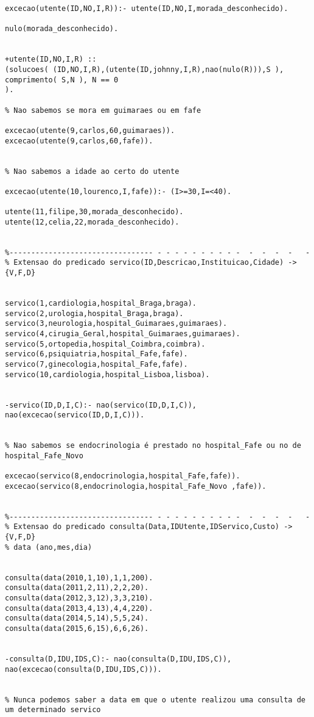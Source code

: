 \documentclass[pdftex,12pt,a4paper]{report}
\begin{document}
\begin{appendices}
\begin{verbatim}
excecao(utente(ID,NO,I,R)):- utente(ID,NO,I,morada_desconhecido).

nulo(morada_desconhecido).


+utente(ID,NO,I,R) :: 
(solucoes( (ID,NO,I,R),(utente(ID,johnny,I,R),nao(nulo(R))),S ),
comprimento( S,N ), N == 0 
).

% Nao sabemos se mora em guimaraes ou em fafe							  

excecao(utente(9,carlos,60,guimaraes)).
excecao(utente(9,carlos,60,fafe)).								  


% Nao sabemos a idade ao certo do utente 

excecao(utente(10,lourenco,I,fafe)):- (I>=30,I=<40).

utente(11,filipe,30,morada_desconhecido).
utente(12,celia,22,morada_desconhecido).									 


%--------------------------------- - - - - - - - - - -  -  -  -  -   -
% Extensao do predicado servico(ID,Descricao,Instituicao,Cidade) ->{V,F,D}


servico(1,cardiologia,hospital_Braga,braga).
servico(2,urologia,hospital_Braga,braga).
servico(3,neurologia,hospital_Guimaraes,guimaraes). 
servico(4,cirugia_Geral,hospital_Guimaraes,guimaraes).
servico(5,ortopedia,hospital_Coimbra,coimbra).
servico(6,psiquiatria,hospital_Fafe,fafe).
servico(7,ginecologia,hospital_Fafe,fafe).
servico(10,cardiologia,hospital_Lisboa,lisboa).


-servico(ID,D,I,C):- nao(servico(ID,D,I,C)),
nao(excecao(servico(ID,D,I,C))).


% Nao sabemos se endocrinologia é prestado no hospital_Fafe ou no de hospital_Fafe_Novo				

excecao(servico(8,endocrinologia,hospital_Fafe,fafe)).
excecao(servico(8,endocrinologia,hospital_Fafe_Novo	,fafe)).


%--------------------------------- - - - - - - - - - -  -  -  -  -   -
% Extensao do predicado consulta(Data,IDUtente,IDServico,Custo) ->{V,F,D}
% data (ano,mes,dia)


consulta(data(2010,1,10),1,1,200).
consulta(data(2011,2,11),2,2,20).
consulta(data(2012,3,12),3,3,210).
consulta(data(2013,4,13),4,4,220).
consulta(data(2014,5,14),5,5,24).
consulta(data(2015,6,15),6,6,26).


-consulta(D,IDU,IDS,C):- nao(consulta(D,IDU,IDS,C)),
nao(excecao(consulta(D,IDU,IDS,C))).


% Nunca podemos saber a data em que o utente realizou uma consulta de um determinado servico


\end{verbatim}
\end{appendices}
\end{document}
